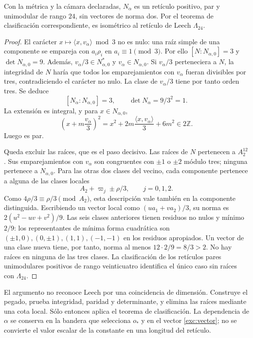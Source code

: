 \begin{theorem}
\label{exc:teorema-leech}
Con la métrica y la cámara declaradas, $N_\alpha$ es un retículo
positivo, par y unimodular de rango $24$, sin vectores de norma dos.
Por el teorema de clasificación correspondiente, es isométrico al
retículo de Leech $\Lambda_{24}$.
\end{theorem}

\begin{proof}
El carácter $x\mapsto\langle x,v_\alpha\rangle\bmod3$ no es nulo:
una raíz simple de una componente se empareja con $a_i\rho_i$ en
$a_i\equiv1\pmod3$. Por ello $[N:N_{\alpha,0}]=3$ y
$\det N_{\alpha,0}=9$. Además,
$v_\alpha/3\in N_{\alpha,0}^*$ y $v_\alpha\in N_{\alpha,0}$.
Si $v_\alpha/3$ perteneciera a $N$, la integridad de $N$ haría que
todos los emparejamientos con $v_\alpha$ fueran divisibles por tres,
contradiciendo el carácter no nulo. La clase de $v_\alpha/3$ tiene
por tanto orden tres. Se deduce
\[
 [N_\alpha:N_{\alpha,0}]=3,
 \qquad \det N_\alpha=9/3^2=1.
\]
La extensión es integral, y para $x\in N_{\alpha,0}$,
\[
 \left(x+m\frac{v_\alpha}{3}\right)^2
   =x^2+2m\frac{\langle x,v_\alpha\rangle}{3}+6m^2
   \in2\mathbb Z.
\]
Luego es par.

Queda excluir las raíces, que es el paso decisivo. Las raíces de $N$
pertenecen a $A_2^{12}$. Sus emparejamientos con $v_\alpha$ son
congruentes con $\pm1$ o $\pm2$ módulo tres; ninguna pertenece a
$N_{\alpha,0}$. Para las otras dos clases del vecino, cada componente
pertenece a alguna de las clases locales
\[
 A_2+\varpi_j\pm\rho/3,\qquad j=0,1,2.
\]
Como $4\rho/3\equiv\rho/3\pmod{A_2}$, esta descripción vale
también en la componente distinguida. Escribiendo un vector local
como $(u a_1+v a_2)/3$, su norma es
$2(u^2-uv+v^2)/9$. Las seis clases anteriores tienen residuos no
nulos y mínimo $2/9$: los representantes de mínima forma cuadrática
son $(\pm1,0),(0,\pm1),(1,1),(-1,-1)$ en los residuos apropiados.
Un vector de una clase nueva tiene, por tanto, norma al menos
$12\cdot2/9=8/3>2$. No hay raíces en ninguna de las tres clases.
La clasificación de los retículos pares unimodulares positivos de
rango veinticuatro identifica el único caso sin raíces con
$\Lambda_{24}$.
\end{proof}

El argumento no reconoce Leech por una coincidencia de dimensión.
Construye el pegado, prueba integridad, paridad y determinante, y
elimina las raíces mediante una cota local. Sólo entonces aplica el
teorema de clasificación. La dependencia de $\alpha$ se conserva en
la bandera que selecciona $o_*$ y en el vector \eqref{exc:vector};
no se convierte el valor escalar de la constante en una longitud del
retículo.

